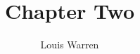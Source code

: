 \documentclass[a4paper]{article}
\begin{document}
\title{Chapter Two}
\author{Louis Warren}
\maketitle

\tableofcontents



\end{document}
